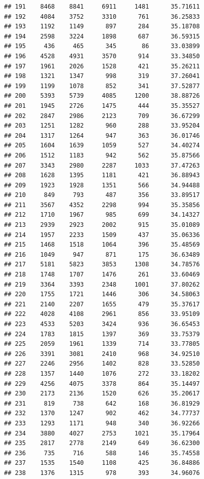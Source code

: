 \documentclass[
]{article}
\begin{document}
\begin{verbatim}
## 191    8468    8841     6911     1481      35.71611
## 192    4084    3752     3310      761      36.25833
## 193    1192    1149      897      284      35.18708
## 194    2598    3224     1898      687      36.59315
## 195     436     465      345       86      33.03899
## 196    4528    4931     3570      914      33.34850
## 197    1961    2026     1528      421      35.26211
## 198    1321    1347      998      319      37.26041
## 199    1199    1078      852      341      37.52877
## 200    5393    5739     4085     1200      38.88726
## 201    1945    2726     1475      444      35.35527
## 202    2847    2986     2123      709      36.67299
## 203    1251    1282      960      288      33.95204
## 204    1317    1264      947      363      36.01746
## 205    1604    1639     1059      527      34.40274
## 206    1512    1183      942      562      35.87566
## 207    3343    2980     2287     1033      37.47263
## 208    1628    1395     1181      421      36.88943
## 209    1923    1928     1351      566      34.94488
## 210     849     793      487      356      33.89517
## 211    3567    4352     2298      994      35.35856
## 212    1710    1967      985      699      34.14327
## 213    2939    2923     2002      915      35.01089
## 214    1957    2233     1509      437      35.06336
## 215    1468    1518     1064      396      35.48569
## 216    1049     947      871      175      36.63489
## 217    5181    5823     3853     1308      34.78576
## 218    1748    1707     1476      261      33.60469
## 219    3364    3393     2348     1001      37.80262
## 220    1755    1721     1446      306      34.58063
## 221    2140    2207     1655      479      35.37617
## 222    4028    4108     2961      856      33.95109
## 223    4533    5203     3424      936      36.65453
## 224    1783    1815     1397      369      33.75379
## 225    2059    1961     1339      714      33.77805
## 226    3391    3081     2410      968      34.92510
## 227    2246    2956     1402      828      33.52850
## 228    1357    1440     1076      272      33.18202
## 229    4256    4075     3378      864      35.14497
## 230    2173    2136     1520      626      35.20617
## 231     819     738      642      168      36.81929
## 232    1370    1247      902      462      34.77737
## 233    1293    1171      948      340      36.92266
## 234    3880    4027     2753     1021      35.17964
## 235    2817    2778     2149      649      36.62300
## 236     735     716      588      146      35.74558
## 237    1535    1540     1108      425      36.84886
## 238    1376    1315      978      393      34.96076

\end{verbatim}
\end{document}
